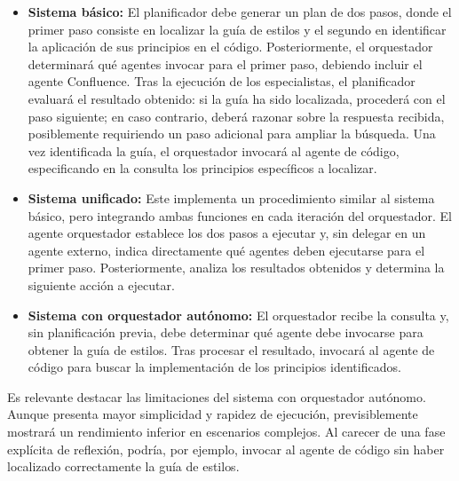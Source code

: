 \begin{itemize}
\item\textbf{Sistema básico:} El planificador debe generar un plan de dos pasos, donde el primer paso consiste en localizar la guía de estilos y el segundo en identificar la aplicación de sus principios en el código. Posteriormente, el orquestador determinará qué agentes invocar para el primer paso, debiendo incluir el agente Confluence. Tras la ejecución de los especialistas, el planificador evaluará el resultado obtenido: si la guía ha sido localizada, procederá con el paso siguiente; en caso contrario, deberá razonar sobre la respuesta recibida, posiblemente requiriendo un paso adicional para ampliar la búsqueda. Una vez identificada la guía, el orquestador invocará al agente de código, especificando en la consulta los principios específicos a localizar.

\item\textbf{Sistema unificado:} Este implementa un procedimiento similar al sistema básico, pero integrando ambas funciones en cada iteración del orquestador. El agente orquestador establece los dos pasos a ejecutar y, sin delegar en un agente externo, indica directamente qué agentes deben ejecutarse para el primer paso. Posteriormente, analiza los resultados obtenidos y determina la siguiente acción a ejecutar.

\item\textbf{Sistema con orquestador autónomo:} El orquestador recibe la consulta y, sin planificación previa, debe determinar qué agente debe invocarse para obtener la guía de estilos. Tras procesar el resultado, invocará al agente de código para buscar la implementación de los principios identificados.
\end{itemize}

Es relevante destacar las limitaciones del sistema con orquestador autónomo. Aunque presenta mayor simplicidad y rapidez de ejecución, previsiblemente mostrará un rendimiento inferior en escenarios complejos. Al carecer de una fase explícita de reflexión, podría, por ejemplo, invocar al agente de código sin haber localizado correctamente la guía de estilos.
